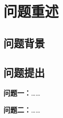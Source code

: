 \section{问题重述}

\subsection{问题背景}

\subsection{问题提出}
\noindent\textbf{问题一：}……

\noindent\textbf{问题二：}……

